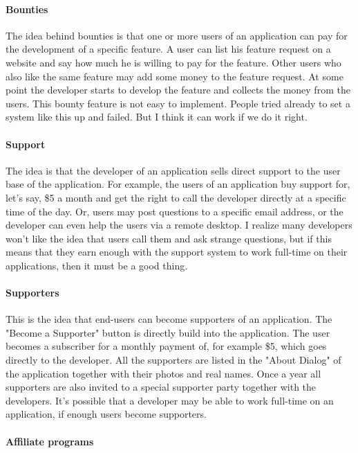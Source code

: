 \paragraph*{Bounties}

The idea behind bounties is that one or more users of an application can pay for the development of a specific feature. A user can list his feature request on a website and say how much he is willing to pay for the feature. Other users who also like the same feature may add some money to the feature request. At some point the developer starts to develop the feature and collects the money from the users. This bounty feature is not easy to implement. People tried already to set a system like this up and failed. But I think it can work if we do it right. 

\paragraph*{Support}

The idea is that the developer of an application sells direct support to the user base of the application. For example, the users of an application buy support for, let's say, \$5 a month and get the right to call the developer directly at a specific time of the day. Or, users may post questions to a specific email address, or the developer can even help the users via a remote desktop. I realize many developers won’t like the idea that users call them and ask strange questions, but if this means that they earn enough with the support system to work full-time on their applications, then it must be a good thing.

\paragraph*{Supporters}

This is the idea that end-users can become supporters of an application. The "Become a Supporter" button is directly build into the application. The user becomes a subscriber for a monthly payment of, for example \$5, which goes directly to the developer. All the supporters are listed in the "About Dialog" of the application together with their photos and real names. Once a year all supporters are also invited to a special supporter party together with the developers. It's possible that a developer may be able to work full-time on an application, if enough users become supporters.

\paragraph*{Affiliate programs}

